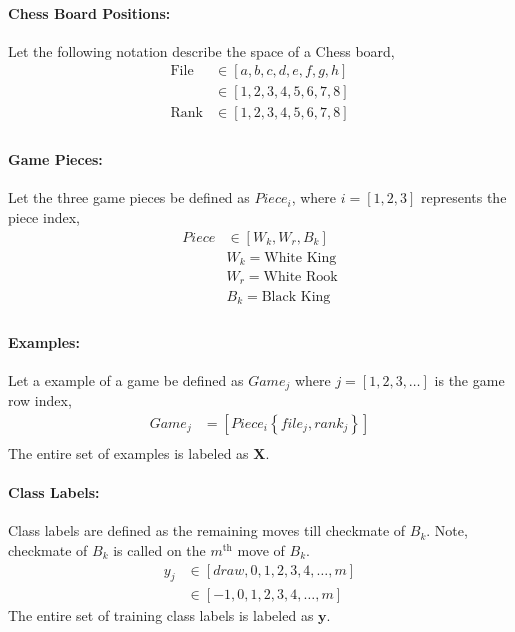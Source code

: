 \documentclass[fleqn]{article}
\begin{document}
\paragraph{Chess Board Positions:}
Let the following notation describe the space of a Chess board,
\begin{equation}
\label{eq:StandardPositions}
\begin{aligned}
	\text{File} &\in \left[a,b,c,d,e,f,g,h\right]\\
	&\in \left[1,2,3,4,5,6,7,8\right]\\
	\text{Rank} &\in \left[1,2,3,4,5,6,7,8\right]\\
\end{aligned}
\end{equation}

\paragraph{Game Pieces:}
Let the three game pieces be defined as $Piece_i$, where $i = \left[1,2,3\right]$ represents the piece index,
\begin{equation}
\label{eq:pieces}
\begin{aligned}
	Piece &\in \left[W_k, W_r, B_k\right]\\
	&W_k = \text{White King}\\
	&W_r = \text{White Rook}\\
	&B_k = \text{Black King}\\
\end{aligned}
\end{equation}

\paragraph{Examples:}
Let a example of a game be defined as $Game_j$ where $j = \left[1,2,3,\dots\right]$ is the game row index, 
%
\begin{equation}
\begin{aligned}
	Game_j &= \left[Piece_i \left\{file_j, rank_j\right\}\right]\\
\end{aligned}
\end{equation}
%
The entire set of examples is labeled as $\mathbf{X}$.

\paragraph{Class Labels:}
Class labels are defined as the remaining moves till checkmate of $B_k$.  Note, checkmate of $B_k$ is called on the $m^{\text{th}}$ move of $B_k$.
\begin{equation}
\begin{aligned}
	y_j &\in \left[draw,0,1,2,3,4, \dots, m\right]\\
	&\in \left[-1,0,1,2,3,4, \dots, m\right]
\end{aligned}
\end{equation}
%
The entire set of training class labels is labeled as $\mathbf{y}$.
\end{document}
